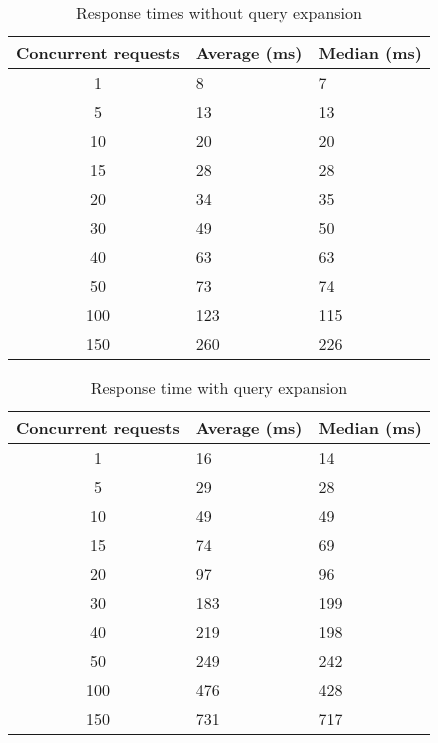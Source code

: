 \begin{table}
    \centering
    \begin{tabular}{c|l|l}

    Concurrent requests & Average (ms) & Median (ms) \\ \hline
    1                   & 8            & 7           \\ \hline
    5                   & 13           & 13          \\ \hline
    10                  & 20           & 20          \\ \hline
    15                  & 28           & 28          \\ \hline
    20                  & 34           & 35          \\ \hline
    30                  & 49           & 50          \\ \hline
    40                  & 63           & 63          \\ \hline
    50                  & 73           & 74          \\ \hline
    100                 & 123          & 115         \\ \hline
    150                 & 260          & 226         \\ \hline
    \end{tabular}
    \caption{Response times without query expansion}
    \label{tbl:baseline}
\end{table}

\begin{table}
    \centering
    \begin{tabular}{c|l|l}
     Concurrent requests & Average (ms) & Median (ms) \\ \hline
    1                    & 16           & 14          \\ \hline
    5                    & 29           & 28          \\ \hline
    10                   & 49           & 49          \\ \hline
    15                   & 74           & 69          \\ \hline
    20                   & 97           & 96          \\ \hline
    30                   & 183          & 199         \\ \hline
    40                   & 219          & 198         \\ \hline
    50                   & 249          & 242         \\ \hline
    100                  & 476          & 428         \\ \hline
    150                  & 731          & 717         \\ \hline
    \end{tabular}
    \caption{Response time with query expansion}
    \label{tbl:query-expansion}
\end{table}


